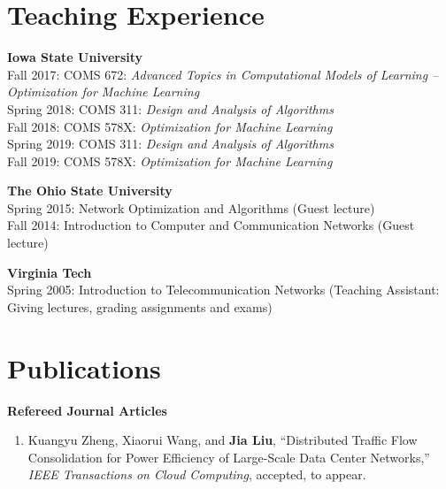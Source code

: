 \documentclass[overlapped,line,letterpaper]{res1}
\begin{document}
\begin{resume}
\section{\bf \large Teaching Experience}

\vspace{.1in}
{\bf Iowa State University} \\
Fall 2017: COMS 672: {\em Advanced Topics in Computational Models of Learning -- Optimization for Machine Learning} \\ %
Spring 2018: COMS 311: {\em Design and Analysis of Algorithms} \\
Fall 2018: COMS 578X: {\em Optimization for Machine Learning} \\
Spring 2019: COMS 311: {\em Design and Analysis of Algorithms} \\
Fall 2019: COMS 578X: {\em Optimization for Machine Learning} \\
\vspace{-.2in}

{\bf The Ohio State University} \\
Spring 2015: Network Optimization and Algorithms (Guest lecture) \\
Fall 2014: Introduction to Computer and Communication Networks (Guest lecture) \\
\vspace{-.2in}

{\bf Virginia Tech}\\
Spring 2005: Introduction to Telecommunication Networks (Teaching Assistant: Giving lectures, grading assignments and exams)

\vspace{.1in}
\section{\bf \large Publications}
\vspace{.08in}
\hspace{-.55in} {\bf Refereed Journal Articles}

\begin{enumerate}
\vspace*{.08in} \item Kuangyu Zheng, Xiaorui Wang, and {\bf Jia Liu}, ``Distributed Traffic Flow Consolidation for Power Efficiency of Large-Scale Data Center Networks,'' {\em IEEE Transactions on Cloud Computing}, accepted, to appear.


\end{enumerate}
\end{resume}
\end{document}
